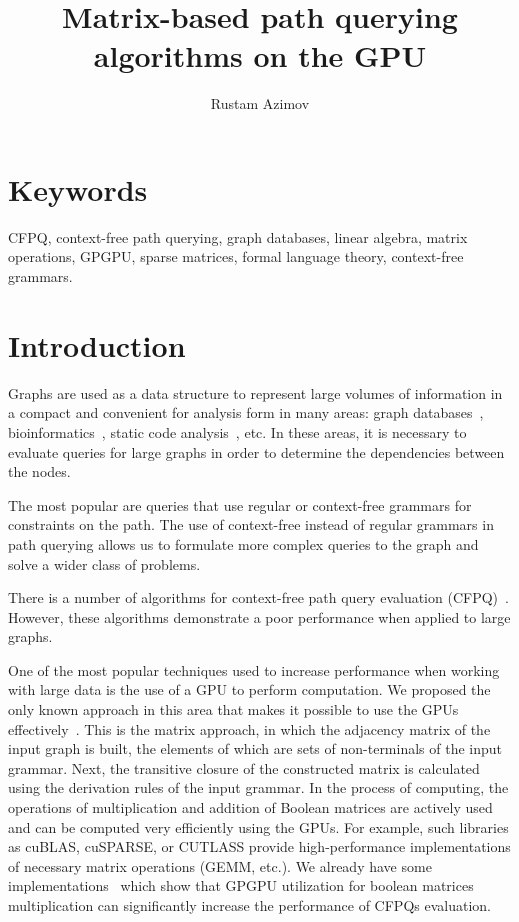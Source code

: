 \documentclass[12pt]{article}  %
\title{Matrix-based path querying algorithms on the GPU}
\author{Rustam Azimov}
\date{}
\theoremstyle{remark}
\begin{document}

\maketitle

\section*{Keywords}
CFPQ, context-free path querying, graph databases, linear algebra, matrix operations, GPGPU, sparse matrices, formal language theory, context-free grammars.

\section{Introduction}
Graphs are used as a data structure to represent large volumes of information in a compact and convenient for analysis form in many areas: graph databases~\cite{redis,graphDB, kuijpers2019experimental}, bioinformatics~\cite{have2013graph, GraphQueryWithEarley}, static code analysis~\cite{kodumal2004set, zhang2013fast}, etc. In these areas, it is necessary to evaluate queries for large graphs in order to determine the dependencies between the nodes. 

The most popular are queries that use regular or context-free grammars for constraints on the path. The use of context-free instead of regular grammars in path querying allows us to formulate more complex queries to the graph and solve a wider class of problems.

There is a number of algorithms for context-free path query evaluation (CFPQ)~\cite{GraphQueryWithEarley, GLL, hellingsRelational, RDF}. However, these algorithms demonstrate a poor performance when applied to large graphs.

One of the most popular techniques used to increase performance when working with large data is the use of a GPU to perform computation. We proposed the only known approach in this area that makes it possible to use the GPUs effectively~\cite{azimov2018context}. This is the matrix approach, in which the adjacency matrix of the input graph is built, the elements of which are sets of non-terminals of the input grammar. Next, the transitive closure of the constructed matrix is calculated using the derivation rules of the input grammar. In the process of computing, the operations of multiplication and addition of Boolean matrices are actively used and can be computed very efficiently using the GPUs. For example, such libraries as cuBLAS, cuSPARSE, or CUTLASS provide high-performance implementations of necessary matrix operations (GEMM, etc.). We already have some implementations~\cite{mishin2019evaluation} which show that GPGPU utilization for boolean matrices multiplication can significantly increase the performance of CFPQs evaluation.
\end{document}
